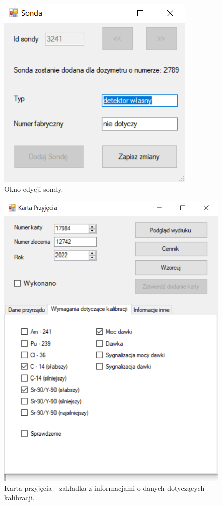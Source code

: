 \begin{figure}[htb]
	\centering
	\includegraphics{obrazki/Biuro/karta/edytuj_sonde.png}
	\caption{Okno edycji sondy.}
	\label{edytujSonde}
\end{figure}

\begin{figure}[htb]
	\centering
	\includegraphics{obrazki/Biuro/karta/karta_dane_wymagania.png}
	\caption{Karta przyjęcia - zakładka z informacjami o danych dotyczących kalibracji.}
	\label{kartaDaneKalibracji}
\end{figure}

